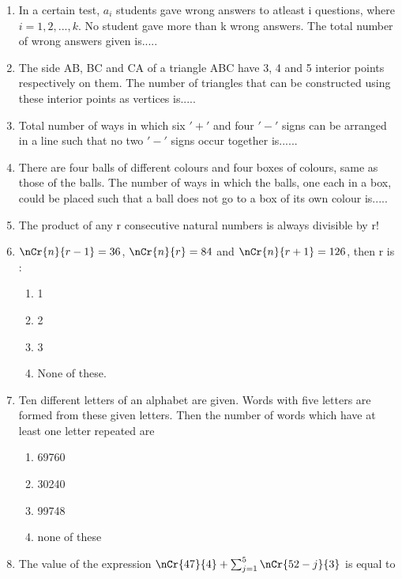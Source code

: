 \renewcommand{\theequation}{\theenumi}
\begin{enumerate}[label=\arabic*.,ref=\thesubsection.\theenumi]

\item In a certain test, $a_i$ students gave wrong answers to atleast i questions, where $i = 1,2,...,k.$ No student gave more than k wrong answers. The total number of wrong answers given is.....\\
\item The side AB, BC and CA of a triangle ABC have 3, 4 and 5 interior points respectively on them. The number of triangles that can be constructed using these interior points as vertices is.....\\
\item Total number of ways in which six $'+'$ and four $'-'$ signs can be arranged in a line such that no two $'-'$ signs occur together is......\\
\item There are four balls of different colours and four boxes of colours, same as those of the balls. The number of ways in which the balls, one each in a box, could be placed such that a ball does not go to a box of its own colour is.....\\
\item The product of any r consecutive natural numbers is always divisible by r!\\
\item $\nCr{n}{r-1} = 36$, $\nCr{n}{r} = 84$ and $\nCr{n}{r+1} = 126$, then r is :
\begin{enumerate}
\item 1
\item 2
\item 3
\item None of these.\\
\end{enumerate}
\item Ten different letters of an alphabet are given. Words with five letters are formed from these given letters. Then the number of words which have at least one letter repeated are
\begin{enumerate}
\item 69760
\item 30240
\item 99748
\item none of these\\
\end{enumerate}
\item The value of the expression $\nCr{47}{4}+\sum_{j=1}^{5} \nCr{52-j}{3}$ is equal to

\end{enumerate}
